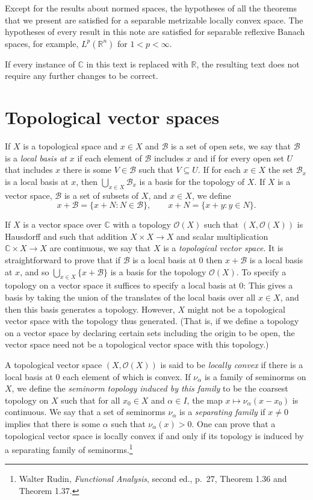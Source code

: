 \documentclass{article}
\begin{document}
Except for the results about normed spaces, the hypotheses of all the theorems that we present are satisfied for a separable metrizable locally convex space. The hypotheses of every result in this note are satisfied for separable reflexive Banach spaces, for example, $L^p(\mathbb{R}^n)$ for $1<p<\infty$.

If every instance of $\mathbb{C}$ in this text is replaced with $\mathbb{R}$, the resulting text does not require any further changes to be correct.



\section{Topological vector spaces}
\label{TVS}
If $X$ is a topological space and $x \in X$ and $\mathcal{B}$ is a set of open sets, we say that $\mathcal{B}$ is a {\em local basis at $x$} if each element of $\mathcal{B}$ includes $x$ and if for every open set
$U$ that includes $x$ there is some $V \in \mathcal{B}$ such that $V \subseteq U$. If for each $x \in X$ the set $\mathcal{B}_x$ is a local basis at $x$, then $\bigcup_{x \in X} \mathcal{B}_x$ is a basis for the topology of $X$.
If $X$ is a vector space, $\mathcal{B}$ is a set of subsets of $X$, and $x \in X$, we define
\[
x+\mathcal{B} = \{x+N: N \in \mathcal{B}\}, \qquad x+N = \{x+y : y \in N\}.
\]

If $X$ is a vector space over $\mathbb{C}$ with a topology $\mathcal{O}(X)$ such that $(X,\mathcal{O}(X))$ is Hausdorff and such that
addition $X \times X \to X$ and
scalar multiplication $\mathbb{C} \times X \to X$ are continuous, we say that $X$ is a {\em topological vector space}.
It is straightforward to prove that if $\mathcal{B}$ is a local basis at $0$ then $x+\mathcal{B}$ is a local basis at $x$, and so 
$\bigcup_{x \in X} \{x+\mathcal{B}\}$ is a basis for the topology $\mathcal{O}(X)$.
To specify a topology on a vector space it suffices to specify a local basis at $0$: This gives a basis by taking the union of the translates of the local basis over all $x \in X$, and then this basis generates a topology. However, $X$ might not be a topological vector space with the topology thus generated. (That is, if we define a topology on a vector space
by declaring certain sets including the origin to be open, the vector space need not be a topological vector space with this topology.)


A topological vector space $(X,\mathcal{O}(X))$ is said to be {\em locally convex} if there is a local basis at $0$ each element of which is convex.
 If $\nu_\alpha$ is a  family of seminorms on $X$, we define the {\em seminorm  topology  induced by this family} to be
 the coarsest topology on $X$ such that for all $x_0 \in X$ and $\alpha \in I$, the map
$x \mapsto \nu_\alpha(x-x_0)$ is continuous.
We say that a set of seminorms $\nu_\alpha$ is a {\em separating family} if $x \neq 0$ implies that there is some $\alpha$ such that $\nu_\alpha(x)>0$.
 One can prove that a topological vector space is locally convex if and only if its topology is induced by a separating family of  seminorms.\footnote{Walter Rudin,
{\em Functional Analysis}, second ed., p.~27, Theorem 1.36 and Theorem 1.37.}
\end{document}
